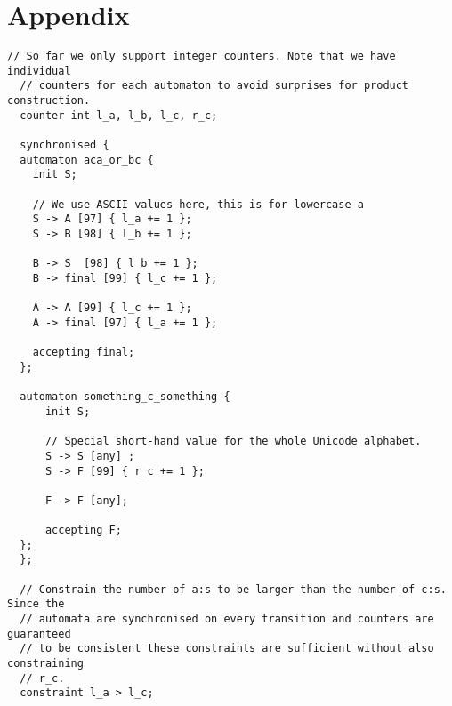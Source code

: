 \documentclass[acmsmall,review,anonymous,screen]{acmart}\settopmatter{printfolios=true,printccs=false,printacmref=true}
\theoremstyle{definition}
\begin{document}



\appendix
\section{Appendix}

\begin{lstlisting}[caption={An example input file for \Catra{} for the problem introduced in \cref{sec:introduction:motivation}, illustrating every major syntax element. From beginning to end: synchronised (product) automata using the keyword \texttt{synchronised} (automata A and B), labels (except those with ranges), register increments, and constraints on the final values of their counters.}, label=lst:input-example]
  // So far we only support integer counters. Note that we have individual
  // counters for each automaton to avoid surprises for product construction.
  counter int l_a, l_b, l_c, r_c;

  synchronised {
  automaton aca_or_bc {
    init S;
  
    // We use ASCII values here, this is for lowercase a
    S -> A [97] { l_a += 1 };
    S -> B [98] { l_b += 1 };
  
    B -> S  [98] { l_b += 1 };
    B -> final [99] { l_c += 1 };
  
    A -> A [99] { l_c += 1 };
    A -> final [97] { l_a += 1 };
  
    accepting final;
  };
  
  automaton something_c_something {
      init S;
  
      // Special short-hand value for the whole Unicode alphabet.
      S -> S [any] ;
      S -> F [99] { r_c += 1 };
  
      F -> F [any];
  
      accepting F;
  };
  };
  
  // Constrain the number of a:s to be larger than the number of c:s. Since the
  // automata are synchronised on every transition and counters are guaranteed
  // to be consistent these constraints are sufficient without also constraining
  // r_c.
  constraint l_a > l_c;
\end{lstlisting}

\end{document}
